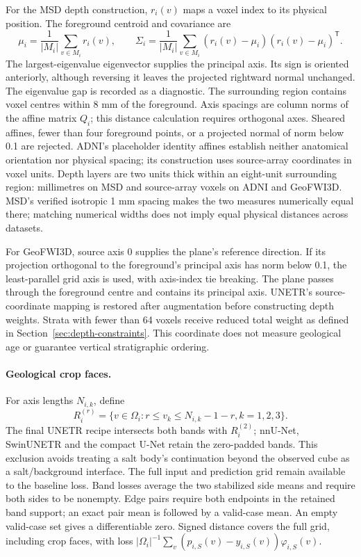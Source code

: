 \documentclass[12pt,a4paper]{article}
\begin{document}
For the MSD depth construction, $r_i(v)$ maps a voxel index to its
physical position. The foreground centroid and covariance are
\begin{equation}
\mu_i=\frac{1}{|M_i|}\sum_{v\in M_i}r_i(v),\qquad
\Sigma_i=\frac{1}{|M_i|}\sum_{v\in M_i}
(r_i(v)-\mu_i)(r_i(v)-\mu_i)^{\mathsf T}.
\label{eq:depth-centroid-covariance}
\end{equation}
The largest-eigenvalue eigenvector supplies the principal axis. Its
sign is oriented anteriorly, although reversing it leaves the projected
rightward normal unchanged. The eigenvalue gap is recorded as a
diagnostic. The surrounding region contains voxel centres within
8 mm of the foreground. Axis spacings are column norms of the affine
matrix $Q_i$; this distance calculation requires orthogonal axes.
Sheared affines, fewer than four foreground points, or a projected
normal of norm below 0.1 are rejected. ADNI's placeholder identity
affines establish neither anatomical orientation nor physical spacing;
its construction uses source-array coordinates in voxel units.
Depth layers are two units thick within an eight-unit surrounding region:
millimetres on MSD and source-array voxels on ADNI and GeoFWI3D. MSD's
verified isotropic 1 mm spacing makes the two measures numerically equal
there; matching numerical widths does not imply equal physical distances
across datasets.

For GeoFWI3D, source axis 0 supplies the plane's reference direction.
If its projection orthogonal to the foreground's principal axis has norm
below 0.1, the least-parallel grid axis is used, with axis-index tie
breaking. The plane passes through the foreground centre and contains
its principal axis. UNETR's source-coordinate mapping is restored after
augmentation before constructing depth weights. Strata with fewer than
64 voxels receive reduced total weight as defined in
Section~\ref{sec:depth-constraints}. This coordinate does not measure
geological age or guarantee vertical stratigraphic ordering.

\paragraph{Geological crop faces.}\label{sec:geo-boundaries}
For axis lengths $N_{i,k}$, define
\begin{equation}
R_i^{(r)}=\{v\in\Omega_i:r\leq v_k\leq N_{i,k}-1-r, k=1,2,3\}.
\label{eq:geological-band-frame}
\end{equation}
The final UNETR recipe intersects both bands with $R_i^{(2)}$;
nnU-Net, SwinUNETR and the compact U-Net retain the zero-padded bands.
This exclusion avoids treating a salt body's continuation beyond the
observed cube as a salt/background interface. The full input and
prediction grid remain available to the baseline loss.
Band losses average the two stabilized side means and require both
sides to be nonempty. Edge pairs require both endpoints in the retained
band support; an exact pair mean is followed by a valid-case mean.
An empty valid-case set gives a differentiable zero. Signed distance
covers the full grid, including crop faces, with loss
$|\Omega_i|^{-1}\sum_v(p_{i,S}(v)-y_{i,S}(v))\varphi_{i,S}(v)$.
\end{document}
